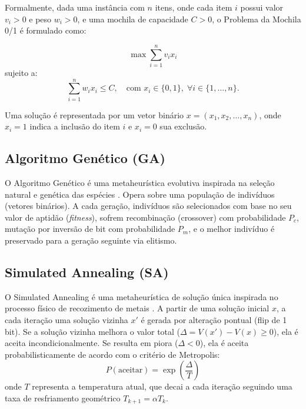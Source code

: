 \documentclass[12pt]{article}
\begin{document}
Formalmente, dada uma instância com $n$ itens, onde cada item $i$ possui valor $v_i > 0$ e peso $w_i > 0$, e uma mochila de capacidade $C > 0$, o Problema da Mochila 0/1 é formulado como:

\begin{equation}
\max \sum_{i=1}^{n} v_i x_i
\end{equation}
sujeito a:
\begin{equation}
\sum_{i=1}^{n} w_i x_i \leq C, \quad \text{com } x_i \in \{0,1\}, \; \forall i \in \{1, \ldots, n\}.
\end{equation}

Uma solução é representada por um vetor binário $x = (x_1, x_2, \dots, x_n)$, onde $x_i = 1$ indica a inclusão do item $i$ e $x_i = 0$ sua exclusão.

\subsection{Algoritmo Genético (GA)}

O Algoritmo Genético é uma metaheurística evolutiva inspirada na seleção natural e genética das espécies \cite{talbi2009}. Opera sobre uma população de indivíduos (vetores binários). A cada geração, indivíduos são selecionados com base no seu valor de aptidão (\textit{fitness}), sofrem recombinação (crossover) com probabilidade $P_c$, mutação por inversão de bit com probabilidade $P_m$, e o melhor indivíduo é preservado para a geração seguinte via elitismo.

\subsection{Simulated Annealing (SA)}

O Simulated Annealing é uma metaheurística de solução única inspirada no processo físico de recozimento de metais \cite{talbi2009}. A partir de uma solução inicial $x$, a cada iteração uma solução vizinha $x'$ é gerada por alteração pontual (flip de 1 bit). Se a solução vizinha melhora o valor total ($\Delta = V(x') - V(x) \geq 0$), ela é aceita incondicionalmente. Se resulta em piora ($\Delta < 0$), ela é aceita probabilisticamente de acordo com o critério de Metropolis:
\begin{equation}
P(\text{aceitar}) = \exp\left(\frac{\Delta}{T}\right)
\end{equation}
onde $T$ representa a temperatura atual, que decai a cada iteração seguindo uma taxa de resfriamento geométrico $T_{k+1} = \alpha T_k$.
\end{document}

